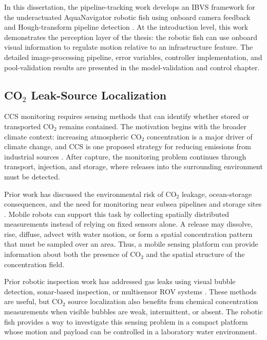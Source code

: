 \documentclass{uhcoethesis}
\begin{document}
In this dissertation, the pipeline-tracking work develops an IBVS framework for the underactuated AquaNavigator robotic fish using onboard camera feedback and Hough-transform pipeline detection \cite{Masood2025Pipeline}. At the introduction level, this work demonstrates the perception layer of the thesis: the robotic fish can use onboard visual information to regulate motion relative to an infrastructure feature. The detailed image-processing pipeline, error variables, controller implementation, and pool-validation results are presented in the model-validation and control chapter.

\subsection[CO2 Leak-Source Localization]{\mbox{CO$_2$} Leak-Source Localization}

CCS monitoring requires sensing methods that can identify whether stored or transported \mbox{CO$_2$} remains contained. The motivation begins with the broader climate context: increasing atmospheric \mbox{CO$_2$} concentration is a major driver of climate change, and CCS is one proposed strategy for reducing emissions from industrial sources \cite{Filonchyk2024,Kabir2023,Herzog2001,Yadav2022,Osman2021}. After capture, the monitoring problem continues through transport, injection, and storage, where releases into the surrounding environment must be detected.

Prior work has discussed the environmental risk of \mbox{CO$_2$} leakage, ocean-storage consequences, and the need for monitoring near subsea pipelines and storage sites \cite{Zheng2021,Mortezaei2021,Queiros2014,Pham2016}. Mobile robots can support this task by collecting spatially distributed measurements instead of relying on fixed sensors alone. A release may dissolve, rise, diffuse, advect with water motion, or form a spatial concentration pattern that must be sampled over an area. Thus, a mobile sensing platform can provide information about both the presence of \mbox{CO$_2$} and the spatial structure of the concentration field.

Prior robotic inspection work has addressed gas leaks using visual bubble detection, sonar-based inspection, or multisensor ROV systems \cite{Zhang2021,Qasem2019,Hu2022}. These methods are useful, but \mbox{CO$_2$} source localization also benefits from chemical concentration measurements when visible bubbles are weak, intermittent, or absent. The robotic fish provides a way to investigate this sensing problem in a compact platform whose motion and payload can be controlled in a laboratory water environment.
\end{document}
